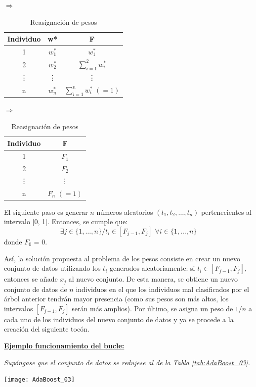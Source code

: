 \documentclass[12pt,twoside]{article}
\begin{document}
\begin{table}[h]
\centering
$\Rightarrow$
\begin{tabular}{|c|c|c|}
\hline
Individuo & w* & F\\ \hline
1 & $w_1^*$ & $w_1^*$ \\ \hline
2 & $w_2^*$ & $\displaystyle \sum_{i=1}^2 w_i^*$ \\ \hline
\vdots & \vdots & \vdots \\ \hline
n & $w_n^*$ & $\displaystyle \sum_{i=1}^n w_i^* \, \, (= 1)$ \\ \hline
\end{tabular}
$\Rightarrow$
\begin{tabular}{|c|c|}
\hline
Individuo & F \\ \hline
1 & $F_1$ \\ \hline
2 & $F_2$ \\ \hline
\vdots & \vdots \\ \hline
n & $F_n \, \, (=1)$ \\ \hline
\end{tabular}
\caption{Reasignación de pesos}
\label{tab:AdaB_pesos}
\end{table}

El siguiente paso es generar $n$ números aleatorios $(t_1, t_2, \dots, t_n)$ pertenecientes al intervalo [0, 1]. Entonces, se cumple que:
\begin{equation*}
\exists j \in \{1, \dots, n \} /t_i \in [F_{j-1}, F_{j}] \, \, \forall i \in \{1, \dots, n \}
\end{equation*}
donde $F_0$ = 0.

Así, la solución propuesta al problema de los pesos consiste en crear un nuevo conjunto de datos utilizando los $t_i$ generados aleatoriamente: si $t_i \in [F_{j-1}, F_{j}]$, entonces se añade $x_j$ al nuevo conjunto. De esta manera, se obtiene un nuevo conjunto de datos de $n$ individuos en el que los individuos mal clasificados por el árbol anterior tendrán mayor presencia (como sus pesos son más altos, los intervalos $[F_{j-1}, F_{j}]$ serán más amplios). Por último, se asigna un peso de $1/n$ a cada uno de los individuos del nuevo conjunto de datos y ya se procede a la creación del siguiente tocón.


\textbf{\underline{Ejemplo funcionamiento del bucle:}}

\textit{Supóngase que el conjunto de datos se redujese al de la Tabla \ref{tab:AdaBoost_03}.}
\begin{table}[H]
\centering
\texttt{[image: AdaBoost\_03]}
\caption{Submuestra del conjunto de datos para ilustrar el funcionamiento del bucle.}
\label{tab:AdaBoost_03}
\end{table}
\end{document}
